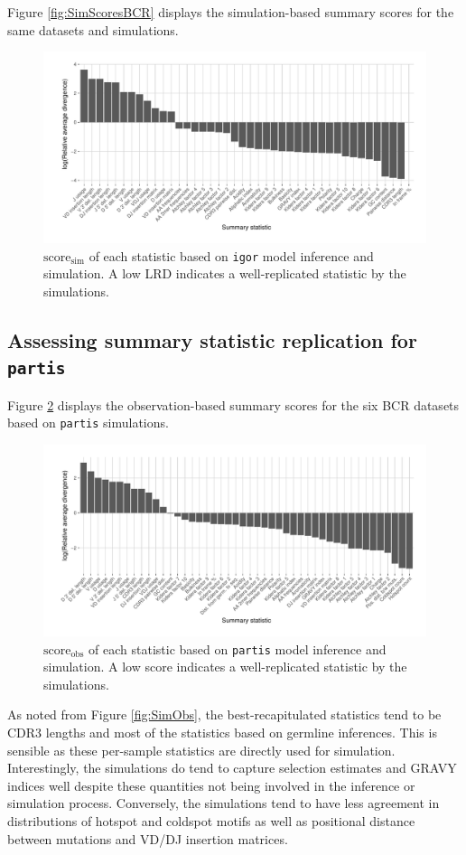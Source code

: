 \documentclass{article}
\begin{document}
Figure \ref{fig:SimScoresBCR} displays the simulation-based summary scores for the same datasets and simulations.
\begin{figure}
    \includegraphics[width=\linewidth]{Figures/IgorScores/sim_score_plot.pdf}
    \caption{$\text{score}_\text{sim}$ of each statistic based on \texttt{igor} model inference and simulation.
        A low LRD indicates a well-replicated statistic by the simulations.
    }
    \label{fig:SimScoresTCR}
\end{figure}

\subsection*{Assessing summary statistic replication for \texttt{partis}}
Figure \ref{fig:ObsScoresBCR} displays the observation-based summary scores for the six BCR datasets based on \texttt{partis} simulations.
\begin{figure}
    \includegraphics[width=\linewidth]{Figures/PartisScores/obs_score_plot.pdf}
    \caption{$\text{score}_\text{obs}$ of each statistic based on \texttt{partis} model inference and simulation.
        A low score indicates a well-replicated statistic by the simulations.
    }
    \label{fig:ObsScoresBCR}
\end{figure}
As noted from Figure \ref{fig:SimObs}, the best-recapitulated statistics tend to be CDR3 lengths and most of the statistics based on germline inferences.
This is sensible as these per-sample statistics are directly used for simulation.
Interestingly, the simulations do tend to capture selection estimates and GRAVY indices well despite these quantities not being involved in the inference or simulation process.
Conversely, the simulations tend to have less agreement in distributions of hotspot and coldspot motifs as well as positional distance between mutations and VD/DJ insertion matrices.
\end{document}

